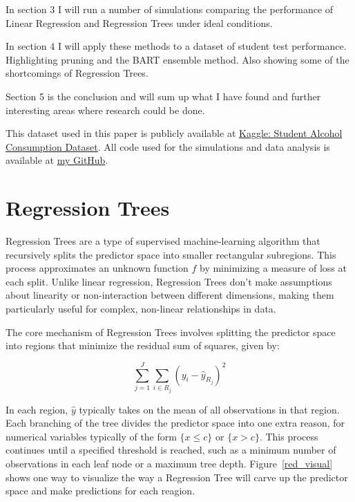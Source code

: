 \documentclass[12pt]{article}
\begin{document}
In section 3 I will run a number of simulations comparing the performance of Linear Regression and Regression Trees under ideal conditions.

In section 4 I will apply these methods to a dataset of student test performance. Highlighting pruning and the BART ensemble method. Also showing some of the shortcomings of Regression Trees.

Section 5 is the conclusion and will sum up what I have found and further interesting areas where research could be done.

This dataset used in this paper is publicly available at \href{https://www.kaggle.com/datasets/uciml/student-alcohol-consumption}{Kaggle: Student Alcohol Consumption Dataset}. All code used for the simulations and data analysis is available at \href{https://github.com/Tim2othy/wissenschaftliches-arbeiten}{my GitHub}.


\section{Regression Trees}

Regression Trees are a type of supervised machine-learning algorithm that recursively splits the predictor space into smaller rectangular subregions. This process approximates an unknown function $f$ by minimizing a measure of loss at each split. Unlike linear regression, Regression Trees don't make assumptions about linearity or non-interaction between different dimensions, making them particularly useful for complex, non-linear relationships in data.

The core mechanism of Regression Trees involves splitting the predictor space into regions that minimize the residual sum of squares, given by:

\begin{equation}
    \sum_{j=1}^{J} \sum_{i \in R_j} ( y_i- \hat{y}_{R_j})^2
\end{equation}

In each region, $\hat{y}$ typically takes on the mean of all observations in that region. Each branching of the tree divides the predictor space into one extra reason, for numerical variables typically of the form $\{x \le c\}$ or $\{x > c\}$. This process continues until a specified threshold is reached, such as a minimum number of observations in each leaf node or a maximum tree depth. Figure~\ref{red_visual} shows one way to visualize the way a Regression Tree will carve up the predictor space and make predictions for each reagion.
\end{document}
